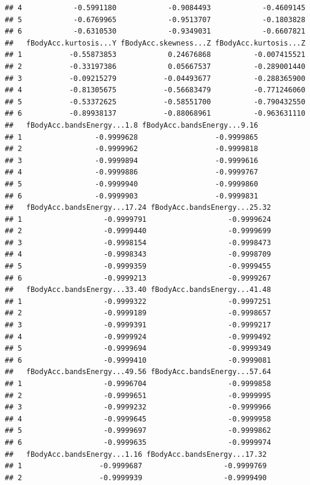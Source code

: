 \documentclass[
]{article}
\begin{document}
\begin{verbatim}
## 4            -0.5991180            -0.9084493            -0.4609145
## 5            -0.6769965            -0.9513707            -0.1803828
## 6            -0.6310530            -0.9349031            -0.6607821
##   fBodyAcc.kurtosis...Y fBodyAcc.skewness...Z fBodyAcc.kurtosis...Z
## 1           -0.55873853            0.24676868          -0.007415521
## 2           -0.33197386            0.05667537          -0.289001440
## 3           -0.09215279           -0.04493677          -0.288365900
## 4           -0.81305675           -0.56683479          -0.771246060
## 5           -0.53372625           -0.58551700          -0.790432550
## 6           -0.89938137           -0.88068961          -0.963631110
##   fBodyAcc.bandsEnergy...1.8 fBodyAcc.bandsEnergy...9.16
## 1                 -0.9999628                  -0.9999865
## 2                 -0.9999962                  -0.9999818
## 3                 -0.9999894                  -0.9999616
## 4                 -0.9999886                  -0.9999767
## 5                 -0.9999940                  -0.9999860
## 6                 -0.9999903                  -0.9999831
##   fBodyAcc.bandsEnergy...17.24 fBodyAcc.bandsEnergy...25.32
## 1                   -0.9999791                   -0.9999624
## 2                   -0.9999440                   -0.9999699
## 3                   -0.9998154                   -0.9998473
## 4                   -0.9998343                   -0.9998709
## 5                   -0.9999359                   -0.9999455
## 6                   -0.9999213                   -0.9999267
##   fBodyAcc.bandsEnergy...33.40 fBodyAcc.bandsEnergy...41.48
## 1                   -0.9999322                   -0.9997251
## 2                   -0.9999189                   -0.9998657
## 3                   -0.9999391                   -0.9999217
## 4                   -0.9999924                   -0.9999492
## 5                   -0.9999694                   -0.9999349
## 6                   -0.9999410                   -0.9999081
##   fBodyAcc.bandsEnergy...49.56 fBodyAcc.bandsEnergy...57.64
## 1                   -0.9996704                   -0.9999858
## 2                   -0.9999651                   -0.9999995
## 3                   -0.9999232                   -0.9999966
## 4                   -0.9999645                   -0.9999958
## 5                   -0.9999697                   -0.9999862
## 6                   -0.9999635                   -0.9999974
##   fBodyAcc.bandsEnergy...1.16 fBodyAcc.bandsEnergy...17.32
## 1                  -0.9999687                   -0.9999769
## 2                  -0.9999939                   -0.9999490

\end{verbatim}
\end{document}
